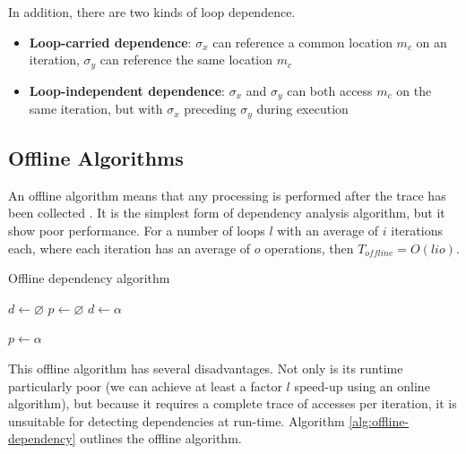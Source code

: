 	In addition, there are two kinds of loop dependence.
	
	\begin{itemize}
		\item \textbf{Loop-carried dependence}: $\sigma_x$ can reference a common location $m_c$ on an iteration, $\sigma_y$ can reference the same location $m_c$
		\item \textbf{Loop-independent dependence}: $\sigma_x$ and $\sigma_y$ can both access $m_c$ on the same iteration, but with $\sigma_x$ preceding $\sigma_y$ during execution
	\end{itemize}

	\subsection{Offline Algorithms} \label{sec:runtime/analysis/offline}
	An offline algorithm means that any processing is performed after the trace has been collected \citep[p.~525-526]{TAOCPvol2}. It is the simplest form of dependency analysis algorithm, but it show poor performance. For a number of loops $l$ with an average of $i$ iterations each, where each iteration has an average of $o$ operations, then $T_{offline}=O(lio)$.
	
	\begin{algorithm}
		\caption{Offline dependency algorithm}
		\label{alg:offline-dependency}
		\begin{algorithmic}[1]
			\STATE $d \gets \varnothing$ %
				\STATE $p \gets \varnothing$ %
								\STATE $d \gets \alpha$
							\ENDIF
							
							\STATE $p \gets \alpha$
						\ENDFOR
					\ENDFOR
				\ENDFOR
			\ENDFOR
		\end{algorithmic}
	\end{algorithm}
	
	This offline algorithm has several disadvantages. Not only is its runtime particularly poor (we can achieve at least a factor $l$ speed-up using an online algorithm), but because it requires a complete trace of accesses per iteration, it is unsuitable for  detecting dependencies at run-time. Algorithm \ref{alg:offline-dependency} outlines the offline algorithm.

